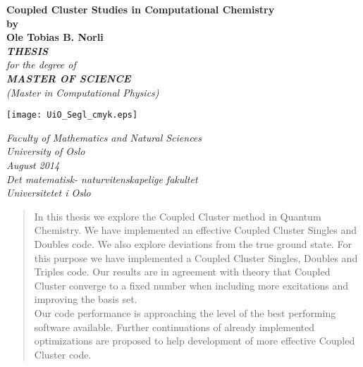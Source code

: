 \documentclass[a4paper,norsk,11pt,twoside]{report}
\date{}
\title{}
\author{}
\begin{document}
\thispagestyle{empty}
\begin{center}        %
  \vspace{5mm}          %
  \LARGE
  \textbf{Coupled Cluster Studies in Computational Chemistry} \\
  \Large
  \vspace{5mm}
  \textbf{by} \\
  \vspace{5mm}
  \large
  \textbf{Ole Tobias B. Norli} \\
  \vspace{30mm}
  \Large
  {\bf{\textsl{THESIS}}} \\
  \textsl{for the degree of} \\
  \vspace{2mm}
  {\bf{\textsl{MASTER OF SCIENCE}}} \\
  \vspace{5mm}
  {\large \textsl {(Master in Computational Physics)}}\\
  \vspace{10mm}
  \centerline{\texttt{[image: UiO\_Segl\_cmyk.eps]}}
  \vspace{5mm}
  \textsl{Faculty of Mathematics and Natural Sciences} \\
  \textsl{University of Oslo} \\
  \vspace{10mm}
  \large
  \textsl{August 2014} \\
  \vspace{5mm}
  \normalsize
  \textsl{Det matematisk- naturvitenskapelige fakultet} \\
  \textsl{Universitetet i Oslo} \\
\end{center}


\begin{abstract}
In this thesis we explore the Coupled Cluster method in Quantum
Chemistry. We have implemented an effective Coupled Cluster Singles
and Doubles code. We also explore deviations from the true ground
state. For this purpose we have implemented a Coupled Cluster Singles,
Doubles and Triples code. Our results are in agreement with theory
that Coupled Cluster converge to a fixed number when including more
excitations and improving the basis set. \\

Our code performance is approaching the level of the best performing
software available. Further continuations of already implemented
optimizations are proposed to help development of more effective
Coupled Cluster code.
\end{abstract}
\end{document}

